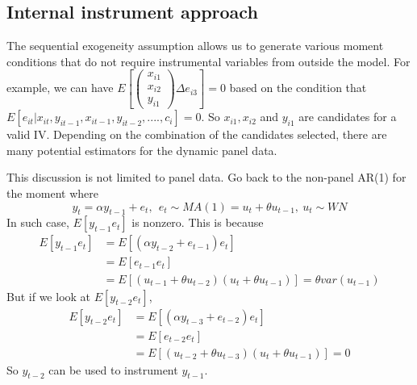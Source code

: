 \documentclass[12pt]{article}
\theoremstyle{definition}
\theoremstyle{property}
\theoremstyle{assumption}
\theoremstyle{example}
\theoremstyle{comment}
\begin{document}
\subsection{Internal instrument approach}
The sequential exogeneity assumption allows us to generate various moment conditions that do not require instrumental variables from outside the model. For example, we can have $E\left[\begin{pmatrix}x_{i1} \\ x_{i2} \\ y_{i1}\end{pmatrix} \Delta e_{i3}\right]=0$ based on the condition that $E[e_{it}| x_{it},y_{it-1}, x_{it-1}, y_{it-2},....,c_i]=0$. So $x_{i1}, x_{i2}$ and $y_{i1}$ are candidates for a valid IV. Depending on the combination of the candidates selected, there are many potential estimators for the dynamic panel data. 
\par
This discussion is not limited to panel data. Go back to the non-panel AR(1) for the moment where
\[
y_{t}=\alpha y_{t-1}+e_t, \ \ e_t\sim MA(1)= u_t+\theta u_{t-1}, \ u_t\sim WN
\]
In such case, $E[y_{t-1}e_t]$ is nonzero. This is because
\[
\begin{aligned}
E[y_{t-1}e_t]&=E[(\alpha y_{t-2}+e_{t-1})e_t]\\
&=E[e_{t-1}e_t]\\
&=E[(u_{t-1}+\theta u_{t-2})(u_{t}+\theta u_{t-1})]=\theta var(u_{t-1})
\end{aligned}
\]
But if we look at $E[y_{t-2}e_t]$, 
\[
\begin{aligned}
E[y_{t-2}e_t]&=E[(\alpha y_{t-3}+e_{t-2})e_t]\\
&=E[e_{t-2}e_t]\\
&=E[(u_{t-2}+\theta u_{t-3})(u_{t}+\theta u_{t-1})]=0
\end{aligned}
\]
So $y_{t-2}$ can be used to instrument $y_{t-1}$. 
\end{document}
